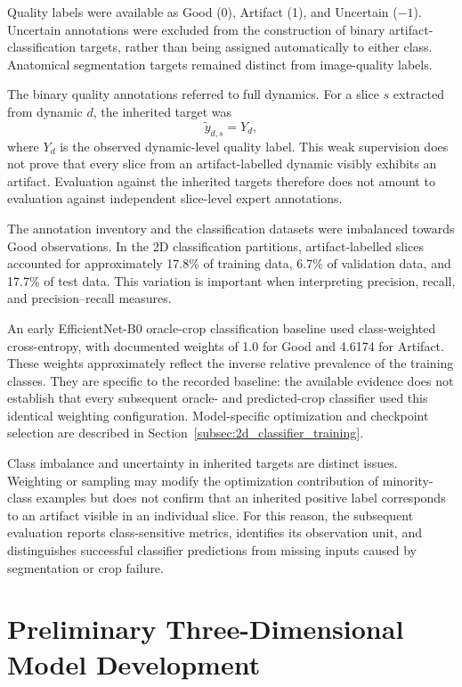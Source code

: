 Quality labels were available as Good (0), Artifact (1), and Uncertain ($-1$). Uncertain annotations were excluded from the construction of binary artifact-classification targets, rather than being assigned automatically to either class. Anatomical segmentation targets remained distinct from image-quality labels.

The binary quality annotations referred to full dynamics. For a slice $s$ extracted from dynamic $d$, the inherited target was
\begin{equation}
\widetilde{y}_{d,s}=Y_d,
\end{equation}
where $Y_d$ is the observed dynamic-level quality label. This weak supervision does not prove that every slice from an artifact-labelled dynamic visibly exhibits an artifact. Evaluation against the inherited targets therefore does not amount to evaluation against independent slice-level expert annotations.

The annotation inventory and the classification datasets were imbalanced towards Good observations. In the 2D classification partitions, artifact-labelled slices accounted for approximately 17.8\% of training data, 6.7\% of validation data, and 17.7\% of test data. This variation is important when interpreting precision, recall, and precision--recall measures.

An early EfficientNet-B0 oracle-crop classification baseline used class-weighted cross-entropy, with documented weights of 1.0 for Good and 4.6174 for Artifact. These weights approximately reflect the inverse relative prevalence of the training classes. They are specific to the recorded baseline: the available evidence does not establish that every subsequent oracle- and predicted-crop classifier used this identical weighting configuration. Model-specific optimization and checkpoint selection are described in Section~\ref{subsec:2d_classifier_training}.

Class imbalance and uncertainty in inherited targets are distinct issues. Weighting or sampling may modify the optimization contribution of minority-class examples but does not confirm that an inherited positive label corresponds to an artifact visible in an individual slice. For this reason, the subsequent evaluation reports class-sensitive metrics, identifies its observation unit, and distinguishes successful classifier predictions from missing inputs caused by segmentation or crop failure.

\section{Preliminary Three-Dimensional Model Development}
\label{sec:preliminary_3d}

